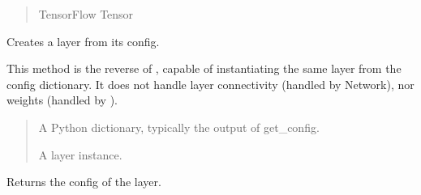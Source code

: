 \documentclass[letterpaper,10pt,english]{sphinxmanual}
\begin{document}
\begin{fulllineitems}
\begin{fulllineitems}
\begin{quote}
\begin{description}
\sphinxAtStartPar
TensorFlow Tensor

\end{description}\end{quote}

\end{fulllineitems}


\begin{fulllineitems}
\label{\detokenize{beyondml.tflow.layers:beyondml.tflow.layers.MultiMaxPool2D.MultiMaxPool2D.from_config}}
\pysigstartsignatures
{}
\pysigstopsignatures
\sphinxAtStartPar
Creates a layer from its config.

\sphinxAtStartPar
This method is the reverse of ,
capable of instantiating the same layer from the config
dictionary. It does not handle layer connectivity
(handled by Network), nor weights (handled by ).
\begin{quote}\begin{description}
\sphinxAtStartPar
{} \textendash{} A Python dictionary, typically the
output of get\_config.

\sphinxAtStartPar
A layer instance.

\end{description}\end{quote}

\end{fulllineitems}


\begin{fulllineitems}
\label{\detokenize{beyondml.tflow.layers:beyondml.tflow.layers.MultiMaxPool2D.MultiMaxPool2D.get_config}}
\pysigstartsignatures
{}
\pysigstopsignatures
\sphinxAtStartPar
Returns the config of the layer.


\end{fulllineitems}
\end{fulllineitems}
\end{document}
